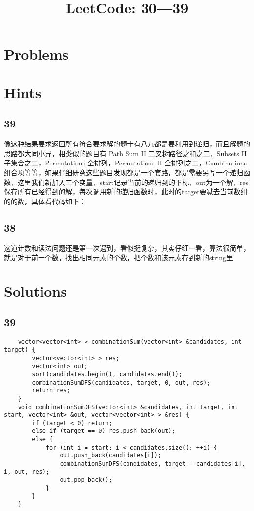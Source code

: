 \documentclass[12pt,a4paper]{article}
\begin{document}
	\title{LeetCode: 30---39}
	\maketitle
	\section*{Problems}
	\section*{Hints}
	\subsection*{39}
	\begin{CJK}{UTF8}{gbsn}
	像这种结果要求返回所有符合要求解的题十有八九都是要利用到递归，而且解题的思路都大同小异，相类似的题目有 Path Sum II 二叉树路径之和之二，Subsets II 子集合之二，Permutations 全排列，Permutations II 全排列之二，Combinations 组合项等等，如果仔细研究这些题目发现都是一个套路，都是需要另写一个递归函数，这里我们新加入三个变量，start记录当前的递归到的下标，out为一个解，res保存所有已经得到的解，每次调用新的递归函数时，此时的target要减去当前数组的的数，具体看代码如下：
	\end{CJK}
	
	\subsection*{38}
	\begin{CJK}{UTF8}{gbsn}
	这道计数和读法问题还是第一次遇到，看似挺复杂，其实仔细一看，算法很简单，就是对于前一个数，找出相同元素的个数，把个数和该元素存到新的string里
	\end{CJK}
	
	
	\section*{Solutions}
	
	\subsection*{39}
	\begin{lstlisting}
	vector<vector<int> > combinationSum(vector<int> &candidates, int target) {
        vector<vector<int> > res;
        vector<int> out;
        sort(candidates.begin(), candidates.end());
        combinationSumDFS(candidates, target, 0, out, res);
        return res;
    }
    void combinationSumDFS(vector<int> &candidates, int target, int start, vector<int> &out, vector<vector<int> > &res) {
        if (target < 0) return;
        else if (target == 0) res.push_back(out);
        else {
            for (int i = start; i < candidates.size(); ++i) {
                out.push_back(candidates[i]);
                combinationSumDFS(candidates, target - candidates[i], i, out, res);
                out.pop_back();
            }
        }
    }
	\end{lstlisting}
	
\end{document}
